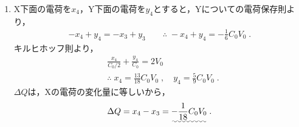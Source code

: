 \documentclass[../../../all/physics-standard_answers_all.tex]{subfiles}
\begin{document}
\begin{enumerate}
    \item X下面の電荷を$x_4$，Y下面の電荷を$y_4$とすると，Yについての電荷保存則より，
        \begin{align*}
            -x_4 + y_4 = -x_3 + y_3
            \qquad \text{∴} \; -x_4 + y_4 = -\frac{1}{6}C_0 V_0 \;.
        \end{align*}
        キルヒホッフ則より，
        \begin{align*}
            & \frac{x_4}{C_0/2} + \frac{y_4}{C_0} = 2V_0 \\
            & \text{∴} \; x_4 = \frac{13}{18}C_0 V_0 \;,
            \quad y_4 = \frac{5}{9}C_0 V_0 \;.
        \end{align*}
        $\Delta Q$は，Xの電荷の変化量に等しいから，
        \begin{align*}
            \Delta Q = x_4 - x_3 = \uwave{-\frac{1}{18}C_0 V_0} \;.
        \end{align*}
        
\end{enumerate}
\end{document}
